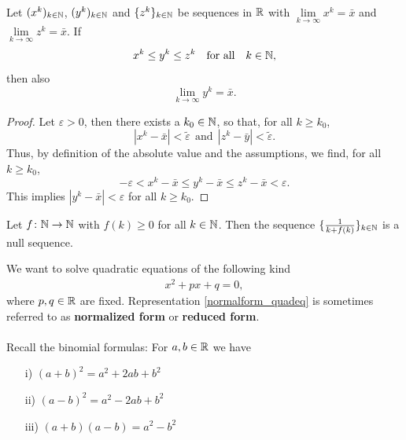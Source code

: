  
\begin{frame} 
~\\[-15pt]
\begin{theo}
	Let $(x^k)_{k\in {\mathbb{N}}}$, $(y^k)_{k\in {\mathbb{N}}}$ and $\{z^k\}_{k\in {\mathbb{N}}}$ be sequences in ${\mathbb{R}}$ with $\lim\limits_{k\to\infty}x^k= \bar{x}$ and $\lim\limits_{k\to\infty}z^k= \bar{x}$. If 
	$$x^k \leq y^k \leq z^k~~~\text{for all}~~~k\in{\mathbb{N}},$$
	then also
	$$\lim\limits_{k\to\infty}y^k= \bar{x}.$$
\end{theo}
\begin{proof}\blank
	Let $\varepsilon> 0$, then there exists a $k_0 \in {\mathbb{N}}$, so that, for all $k \geq k_0$,
	$$|x^k-\bar{x}| <  \tilde{\varepsilon} ~~\text{and}~~|z^k-\bar{y}| <  \tilde{\varepsilon}.$$
	Thus, by definition of the absolute value and the assumptions, we find, for all $k \geq k_0$,
	$$-\varepsilon< x^k-\bar{x} \leq y^k-\bar{x} \leq z^k- \bar{x} < \varepsilon.$$
	This implies $|y^k - \bar{x}|< \varepsilon$ for all $k \geq k_0$.
\end{proof}
 \end{frame}
\begin{frame} 
\begin{ex}
	Let $f\colon {\mathbb{N}} \to {\mathbb{N}}$ with $f(k) \geq 0$ for all $k \in {\mathbb{N}}$. Then the sequence $\{\frac{1}{k + f(k)}\}_{k\in {\mathbb{N}}}$ is a null sequence.
\end{ex}
 \end{frame}




\begin{frame} 
We want to solve quadratic equations of the following kind
\begin{align} \label{normalform_quadeq}
x^2 + px +q = 0, 
\end{align}
where $p,q\in {\mathbb{R}}$ are fixed. Representation \eqref{normalform_quadeq} is sometimes referred to as {\color{defgruen} \textbf{normalized form}} or {\color{defgruen} \textbf{reduced form}}.\\
~\\
Recall the binomial formulas: For $a,b \in {\mathbb{R}}$ we have
\begin{itemize}
	\item[i)] $(a+b)^2 = a^2 + 2ab + b^2$ 
	\item[ii)] $(a-b)^2 = a^2 - 2ab + b^2$ 
	\item[iii)] $(a+b)(a-b) = a^2 - b^2$ 
\end{itemize}
\vspace{0.3cm}
\end{frame}


